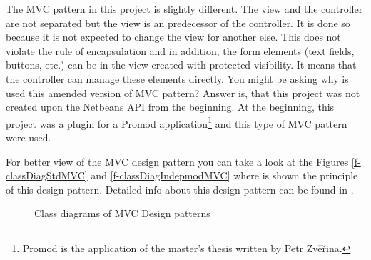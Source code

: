 The MVC pattern in this project is slightly different. The view and the controller are not separated but the view is an predecessor of the controller. It is done so because it is not expected to change the view for another else. This does not violate the rule of encapsulation and in addition, the form elements (text fields, buttons, etc.) can be in the view created with protected visibility. It means that the controller can manage these elements directly. You might be asking why is used this amended version of MVC pattern? Answer is, that this project was not created upon the Netbeans API from the beginning. At the beginning, this project was a plugin for a Promod application\footnote{Promod is the application of the master's thesis written by Petr Zv\v{e}\v{r}ina.} and this type of MVC pattern were used.

For better view of the MVC design pattern you can take a look at the Figures \ref{f-classDiagStdMVC} and \ref{f-classDiagIndepmodMVC} where is shown the principle of this design pattern. Detailed info about this design pattern can be found in \cite{DesignPatterns}.

\begin{figure}[!ht]
\begin{center}
\caption{Class diagrams of MVC Design patterns}
\label{f-classDiagMVC}
\end{center}
\end{figure}

